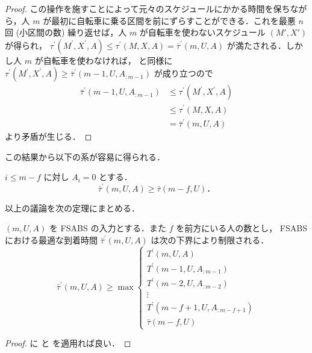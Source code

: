 \begin{proof}
この操作を施すことによって元々のスケジュールにかかる時間を保ちながら，人 $m$ が最初に自転車に乗る区間を前にずらすことができる．これを最悪 $n$ 回 (小区間の数) 繰り返せば，人 $m$ が自転車を使わないスケジュール $(M\prime, X\prime)$ が得られ， $\tau^\prime(M^\prime, X^\prime, A) \leq \tau^\prime(M, X, A) = \bar\tau^{\prime}(m, U, A)$ が満たされる．しかし人 $m$ が自転車を使わなければ，  と同様に $\tau^\prime(M^\prime, X^\prime, A) \geq \bar\tau^\prime(m - 1, U, A_{:m-1})$ が成り立つので
\begin{align}
  \bar\tau^\prime(m - 1, U, A_{:m-1}) &\leq \tau^\prime(M^\prime, X^\prime, A) \\
                                      &\leq \tau^\prime(M, X, A) \\
                                      &= \bar\tau^\prime(m, U, A)
\end{align}
より矛盾が生じる．
\end{proof}
この結果から以下の系が容易に得られる．
\begin{corollary}\label{corollary:fsabs-lower-bound-bs}
  $i \leq m - f$ に対し $A_i = 0$ とする．
  \begin{equation}
    \bar\tau^{\prime}(m, U, A) \geq \bar\tau(m - f, U)．
  \end{equation}
\end{corollary}

以上の議論を次の定理にまとめる．
\begin{theorem}\label{theorem:fsabs-lower-bound}
  $(m, U, A)$ を FSABS の入力とする．また $f$ を前方にいる人の数とし， FSABS における最適な到着時間 $\bar\tau^\prime(m, U, A)$ は次の下界により制限される．
  \begin{equation}
    \bar\tau^\prime(m, U, A) \geq \max \begin{cases}
      T^\prime(m, U, A) \\
      T^\prime(m - 1, U, A_{:m-1}) \\
      T^\prime(m - 2, U, A_{:m-2}) \\
      \vdots \\
      T^\prime(m - f + 1, U, A_{:m-f+1}) \\
      \bar\tau(m - f, U)
    \end{cases}
  \end{equation}
\end{theorem}
\begin{proof}
   に  と  を適用れば良い．
\end{proof}